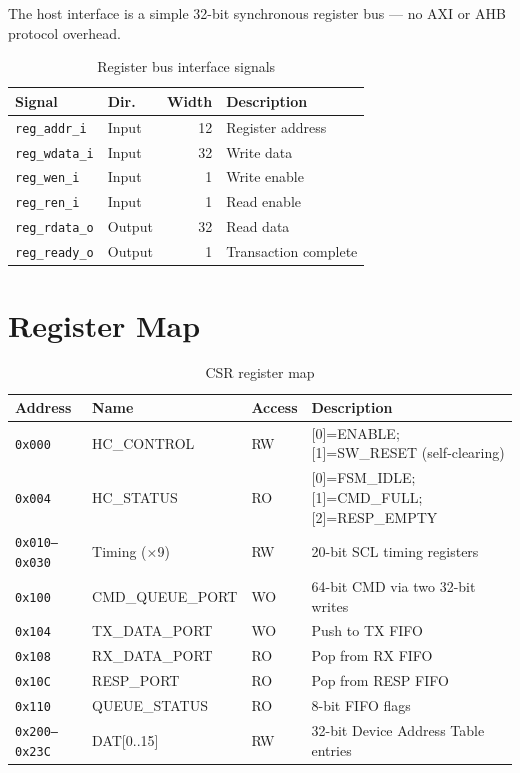 \documentclass[12pt, a4paper, oneside]{report}
\newcommand{\signal}[1]{\texttt{#1}}
\begin{document}
The host interface is a simple 32-bit synchronous register bus --- no AXI or AHB
protocol overhead.

\begin{table}[H]
\centering
\caption{Register bus interface signals}
\label{tab:reg_bus}
\begin{tabular}{llrl}
\toprule
\textbf{Signal} & \textbf{Dir.} & \textbf{Width} & \textbf{Description} \\
\midrule
\signal{reg\_addr\_i}  & Input  & 12 & Register address \\
\signal{reg\_wdata\_i} & Input  & 32 & Write data \\
\signal{reg\_wen\_i}   & Input  &  1 & Write enable \\
\signal{reg\_ren\_i}   & Input  &  1 & Read enable \\
\signal{reg\_rdata\_o} & Output & 32 & Read data \\
\signal{reg\_ready\_o} & Output &  1 & Transaction complete \\
\bottomrule
\end{tabular}
\end{table}

\section{Register Map}

\begin{table}[H]
\centering
\caption{CSR register map}
\label{tab:regmap}
\begin{tabularx}{\textwidth}{L{2.4cm} L{3.5cm} C{1.4cm} L{5.5cm}}
\toprule
\textbf{Address} & \textbf{Name} & \textbf{Access} & \textbf{Description} \\
\midrule
\texttt{0x000} & HC\_CONTROL    & RW & [0]=ENABLE; [1]=SW\_RESET (self-clearing) \\
\texttt{0x004} & HC\_STATUS     & RO & [0]=FSM\_IDLE; [1]=CMD\_FULL; [2]=RESP\_EMPTY \\
\texttt{0x010--0x030} & Timing (×9) & RW & 20-bit SCL timing registers \\
\texttt{0x100} & CMD\_QUEUE\_PORT & WO & 64-bit CMD via two 32-bit writes \\
\texttt{0x104} & TX\_DATA\_PORT & WO & Push to TX FIFO \\
\texttt{0x108} & RX\_DATA\_PORT & RO & Pop from RX FIFO \\
\texttt{0x10C} & RESP\_PORT     & RO & Pop from RESP FIFO \\
\texttt{0x110} & QUEUE\_STATUS  & RO & 8-bit FIFO flags \\
\texttt{0x200--0x23C} & DAT[0..15] & RW & 32-bit Device Address Table entries \\
\bottomrule
\end{tabularx}
\end{table}
\end{document}
